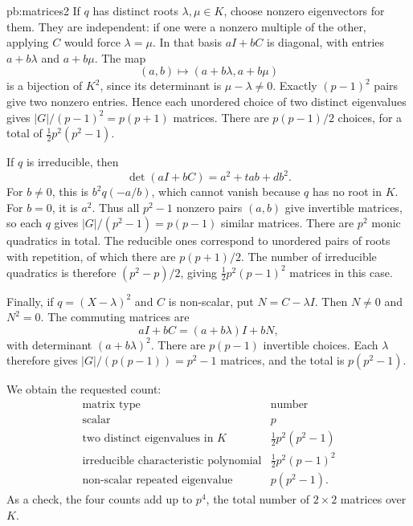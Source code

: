 \begin{solution}{pb:matrices2}
If $q$ has distinct roots $\lambda,\mu\in K$, choose nonzero eigenvectors for them. They are independent: if one were a nonzero multiple of the other, applying $C$ would force $\lambda=\mu$. In that basis $aI+bC$ is diagonal, with entries $a+b\lambda$ and $a+b\mu$. The map
\[
(a,b)\longmapsto(a+b\lambda,a+b\mu)
\]
is a bijection of $K^2$, since its determinant is $\mu-\lambda\ne0$. Exactly $(p-1)^2$ pairs give two nonzero entries. Hence each unordered choice of two distinct eigenvalues gives $|G|/(p-1)^2=p(p+1)$ matrices. There are $p(p-1)/2$ choices, for a total of $\frac12p^2(p^2-1)$.

If $q$ is irreducible, then
\[
\det(aI+bC)=a^2+tab+db^2.
\]
For $b\ne0$, this is $b^2q(-a/b)$, which cannot vanish because $q$ has no root in $K$. For $b=0$, it is $a^2$. Thus all $p^2-1$ nonzero pairs $(a,b)$ give invertible matrices, so each $q$ gives $|G|/(p^2-1)=p(p-1)$ similar matrices. There are $p^2$ monic quadratics in total. The reducible ones correspond to unordered pairs of roots with repetition, of which there are $p(p+1)/2$. The number of irreducible quadratics is therefore $(p^2-p)/2$, giving $\frac12p^2(p-1)^2$ matrices in this case.

Finally, if $q=(X-\lambda)^2$ and $C$ is non-scalar, put $N=C-\lambda I$. Then $N\ne0$ and $N^2=0$. The commuting matrices are
\[
aI+bC=(a+b\lambda)I+bN,
\]
with determinant $(a+b\lambda)^2$. There are $p(p-1)$ invertible choices. Each $\lambda$ therefore gives $|G|/(p(p-1))=p^2-1$ matrices, and the total is $p(p^2-1)$.

We obtain the requested count:
\[
\begin{array}{l|r}
\text{matrix type}&\text{number}\\\hline
\text{scalar}&p\\
\text{two distinct eigenvalues in }K&\frac12p^2(p^2-1)\\
\text{irreducible characteristic polynomial}&\frac12p^2(p-1)^2\\
\text{non-scalar repeated eigenvalue}&p(p^2-1).
\end{array}
\]
As a check, the four counts add up to $p^4$, the total number of $2\times2$ matrices over $K$.


\end{solution}
